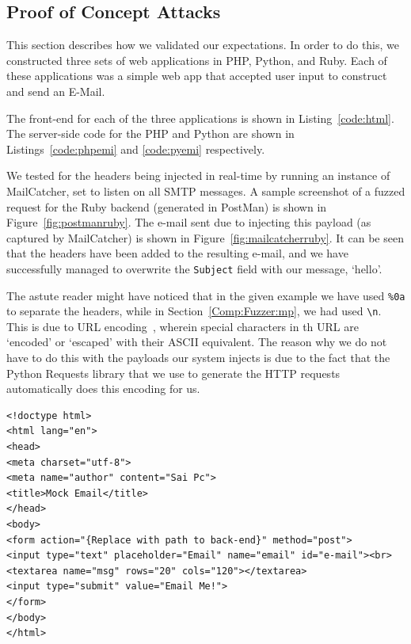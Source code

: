 \subsection*{Proof of Concept Attacks}
This section describes how we validated our expectations. In order to do this, we constructed three sets of web applications in PHP, Python, and Ruby. Each of these applications was a simple web app that accepted user input to construct and send an E-Mail.

The front-end for each of the three applications is shown in Listing~\ref{code:html}. The server-side code for the PHP and Python are shown in Listings~\ref{code:phpemi} and \ref{code:pyemi} respectively.

We tested for the headers being injected in real-time by running an instance of MailCatcher, set to listen on all SMTP messages. A sample screenshot of a fuzzed request for the Ruby backend (generated in PostMan) is shown in Figure~\ref{fig:postmanruby}. The e-mail sent due to injecting this payload (as captured by MailCatcher) is shown in Figure~\ref{fig:mailcatcherruby}. It can be seen that the headers have been added to the resulting e-mail, and we have successfully managed to overwrite the \texttt{Subject} field with our message, `hello'.

The astute reader might have noticed that in the given example we have used \texttt{\%0a} to separate the headers, while in Section~\ref{Comp:Fuzzer:mp}, we had used \texttt{\textbackslash{}n}. This is due to URL encoding~\cite{rfc1738}, wherein special characters in th URL are `encoded' or `escaped' with their ASCII equivalent.
The reason why we do not have to do this with the payloads our system injects is due to the fact that the Python Requests library that we use to generate the HTTP requests automatically does this encoding for us.

\begin{lstlisting}
<!doctype html>
<html lang="en">
<head>
<meta charset="utf-8">
<meta name="author" content="Sai Pc">
<title>Mock Email</title>
</head>
<body>
<form action="{Replace with path to back-end}" method="post">
<input type="text" placeholder="Email" name="email" id="e-mail"><br>
<textarea name="msg" rows="20" cols="120"></textarea>
<input type="submit" value="Email Me!">
</form>
</body>
</html>
\end{lstlisting}

